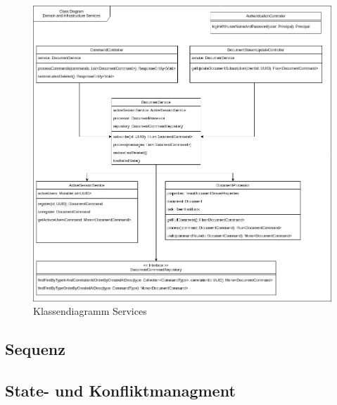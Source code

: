 \begin{figure}[h]
    \centering
    \begin{minipage}[b]{0.8\textwidth}
        \includegraphics[width=\textwidth]{graphics/class-be.drawio}
        \caption{Klassendiagramm Services}
    \end{minipage}
\end{figure}

\clearpage

\subsection{Sequenz}

\clearpage

\subsection{State- und Konfliktmanagment}

\clearpage

